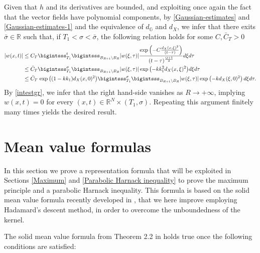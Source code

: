 \documentclass[11pt,a4paper]{article}
\numberwithin{equation}{section}
\newcommand{\R}{\mathbb{R}}
\def \rn {{\mathbb {R}}^{N}}
\def \s {\sigma}
\def \GG {{\mathbb{G}}}
\def \t {{\tau}}
\def \x {{\xi}}
\begin{document}
\begin{pf-fundamental}
\begin{equation}
	\end{equation}
	Given that $h$ and its derivatives are bounded, and exploiting once again the fact that the vector fields have polynomial components, by \eqref{Gaussian-estimates} and \eqref{Gaussian-estimates-1} and the equivalence of $d_\GG$ and $d_X$, we infer that there exits $\bar \sigma \in \R$ such that, if $T_1<\sigma<\bar \sigma$, the following relation holds for some $C,\bar C_T>0$
	\begin{equation}
		\begin{aligned}
			|w(x,t)|&\leq C_T\bigintsss_{T_1}^t\bigintsss_{B_{R+1}\setminus B_R}|w(\x,\t)|\frac{\exp{\left(-C\frac{d_X(x,\x)^2}{(t-\t)}\right)}}{(t-\tau)^{\frac{Q+1}{2}}} d\x d\t\\
			&\leq \bar C_T\bigintsss_{T_1}^\s\bigintsss_{B_{R+1}\setminus B_R}|w(\x,\t)|\exp{\left(-kk_1^2d_X(x,\x)^2\right)}d\x d\t\\
			&\leq \bar C_T\,\exp{\left((1-kk_1)d_X(x,0)^2\right)}\bigintsss_{T_1}^\s\bigintsss_{B_{R+1}\setminus B_R}|w(\x,\t)|\exp\left({-kd_X(\x,0)^2}\right)d\x d\t.
		\end{aligned}
	\end{equation}
	By \eqref{intestgr}, we infer that the right hand-side vanishes as $R\rightarrow +\infty$, implying $w(x,t)=0$ for every $(x,t)\in \rn\times (T_1,\s)$. Repeating this argument finitely many times yields the desired result.
\end{pf-fundamental}
	









\section{Mean value formulas}\label{Mean-Value-Formula}
In this section we prove a representation formula that will be exploited in Sections \ref{Maximum} and \ref{Parabolic Harnack inequality} to prove the maximum principle and a parabolic Harnack inequality. This formula is based on the solid mean value formula recently developed in \cite{pallara2023meanvalueformulasclassical}, that we here improve employing Hadamard's descent method, in order to overcome the unboundedness of the kernel. 


The solid mean value formula from Theorem 2.2 in \cite{pallara2023meanvalueformulasclassical} holds true once the following conditions are satisfied:
\end{document}
